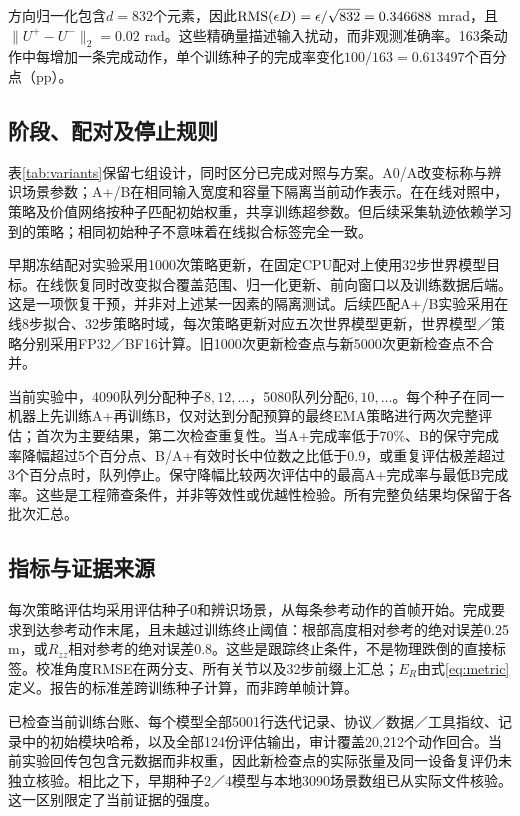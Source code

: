 方向归一化包含$d=832$个元素，因此$\operatorname{RMS}(\epsilon D)=\epsilon/\sqrt{832}=0.346688$ mrad，且$\|U^+-U^-\|_2=0.02$ rad。这些精确量描述输入扰动，而非观测准确率。163条动作中每增加一条完成动作，单个训练种子的完成率变化$100/163=0.613497$个百分点（pp）。




\subsection{阶段、配对及停止规则}
表\ref{tab:variants}保留七组设计，同时区分已完成对照与方案。A0/A改变标称与辨识场景参数；A+/B在相同输入宽度和容量下隔离当前动作表示。在在线对照中，策略及价值网络按种子匹配初始权重，共享训练超参数。但后续采集轨迹依赖学习到的策略；相同初始种子不意味着在线拟合标签完全一致。

早期冻结配对实验采用1000次策略更新，在固定CPU配对上使用32步世界模型目标。在线恢复同时改变拟合覆盖范围、归一化更新、前向窗口以及训练数据后端。这是一项恢复干预，并非对上述某一因素的隔离测试。后续匹配A+/B实验采用在线8步拟合、32步策略时域，每次策略更新对应五次世界模型更新，世界模型／策略分别采用FP32／BF16计算。旧1000次更新检查点与新5000次更新检查点不合并。

当前实验中，4090队列分配种子$8,12,\ldots$，5080队列分配$6,10,\ldots$。每个种子在同一机器上先训练A+再训练B，仅对达到分配预算的最终EMA策略进行两次完整评估；首次为主要结果，第二次检查重复性。当A+完成率低于70\%、B的保守完成率降幅超过5个百分点、B/A+有效时长中位数之比低于0.9，或重复评估极差超过3个百分点时，队列停止。保守降幅比较两次评估中的最高A+完成率与最低B完成率。这些是工程筛查条件，并非等效性或优越性检验。所有完整负结果均保留于各批次汇总。

\subsection{指标与证据来源}
每次策略评估均采用评估种子0和辨识场景，从每条参考动作的首帧开始。完成要求到达参考动作末尾，且未越过训练终止阈值：根部高度相对参考的绝对误差0.25 m，或$R_{zz}$相对参考的绝对误差0.8。这些是跟踪终止条件，不是物理跌倒的直接标签。校准角度RMSE在两分支、所有关节以及32步前缀上汇总；$E_R$由式\eqref{eq:metric}定义。报告的标准差跨训练种子计算，而非跨单帧计算。

已检查当前训练台账、每个模型全部5001行迭代记录、协议／数据／工具指纹、记录中的初始模块哈希，以及全部124份评估输出，审计覆盖20,212个动作回合。当前实验回传包包含元数据而非权重，因此新检查点的实际张量及同一设备复评仍未独立核验。相比之下，早期种子2／4模型与本地3090场景数组已从实际文件核验。这一区别限定了当前证据的强度。


